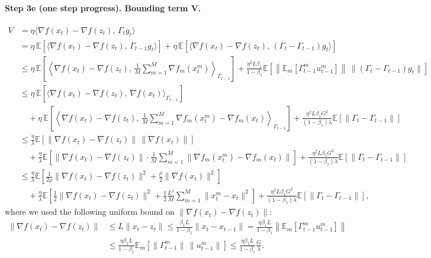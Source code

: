 \paragraph{Step 3e (one step progress). Bounding term V.}
\begin{align*}
V &= \eta\langle \nabla f(x_t) - \nabla f(z_t),\, \Gamma_t g_t \rangle \\
&= \eta\,\mathbb{E}\!\left[\langle \nabla f(x_t)-\nabla f(z_t),\, \Gamma_{t-1} g_t \rangle\right]
   + \eta\,\mathbb{E}\!\left[\langle \nabla f(x_t)-\nabla f(z_t),\, (\Gamma_t-\Gamma_{t-1}) g_t \rangle\right] \\
&\leq \eta\,\mathbb{E}\!\left[\left\langle \nabla f(x_t)-\nabla f(z_t),\, \frac{1}{M}\sum_{m=1}^{M}\nabla f_m(x_t^m) \right\rangle_{\!\Gamma_{t-1}}\right]
   + \frac{\eta^2 L \beta_1}{1-\beta_1}\mathbb{E}\!\left[\left\|\mathbb{E}_m[\Gamma_{t-1}^m u_{t-1}^m]\right\|\,\|(\Gamma_t-\Gamma_{t-1}) g_t\|\right] \\
&\leq \eta\,\mathbb{E}\!\left[\langle \nabla f(x_t)-\nabla f(z_t),\, \nabla f(x_t) \rangle_{\Gamma_{t-1}}\right] \\
&\quad + \eta\,\mathbb{E}\!\left[\left\langle \nabla f(x_t)-\nabla f(z_t),\, \frac{1}{M}\sum_{m=1}^{M}\nabla f_m(x_t^m)-\nabla f_m(x_t) \right\rangle_{\!\Gamma_{t-1}}\right]
   + \frac{\eta^2 L \beta_1 G^2}{(1-\beta_1)\lambda}\mathbb{E}\!\left[\|\Gamma_t-\Gamma_{t-1}\|\right] \\
&\leq \frac{\eta}{\lambda}\mathbb{E}\!\left[\|\nabla f(x_t)-\nabla f(z_t)\|\,\|\nabla f(x_t)\|\right] \\
&\quad + \frac{\eta}{\lambda}\mathbb{E}\!\left[\|\nabla f(x_t)-\nabla f(z_t)\|\cdot\frac{1}{M}\sum_{m=1}^{M}\|\nabla f_m(x_t^m)-\nabla f_m(x_t)\|\right]
   + \frac{\eta^2 L \beta_1 G^2}{(1-\beta_1)\lambda}\mathbb{E}\!\left[\|\Gamma_t-\Gamma_{t-1}\|\right] \\
&\leq \frac{\eta}{\lambda}\mathbb{E}\!\left[\frac{1}{2\rho}\|\nabla f(x_t)-\nabla f(z_t)\|^2 + \frac{\rho}{2}\|\nabla f(x_t)\|^2\right] \\
&\quad + \frac{\eta}{\lambda}\mathbb{E}\!\left[\frac{1}{2}\|\nabla f(x_t)-\nabla f(z_t)\|^2 + \frac{1}{2}\frac{L^2}{M}\sum_{m=1}^{M}\|x_t^m - x_t\|^2\right]
   + \frac{\eta^2 L \beta_1 G^2}{(1-\beta_1)\lambda}\mathbb{E}\!\left[\|\Gamma_t-\Gamma_{t-1}\|\right],
\end{align*}
where we used the following uniform bound on $\|\nabla f(x_t)-\nabla f(z_t)\|$:
\begin{align*}
\|\nabla f(x_t)-\nabla f(z_t)\|
&\leq L\|x_t - z_t\|
\leq \frac{\beta_1 L}{1-\beta_1}\|x_t - x_{t-1}\|
= \frac{\eta\beta_1 L}{1-\beta_1}\left\|\mathbb{E}_m[\Gamma_{t-1}^m u_{t-1}^m]\right\| \\
&\leq \frac{\eta\beta_1 L}{1-\beta_1}\mathbb{E}_m[\|\Gamma_{t-1}^m\|\,\|u_{t-1}^m\|]
\leq \frac{\eta\beta_1 L}{1-\beta_1}\frac{G}{\lambda}.
\end{align*}

